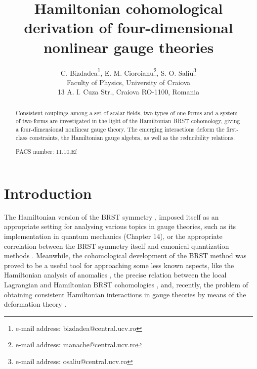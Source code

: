\documentclass[a4paper,12pt]{article}
\begin{document}
\author{C. Bizdadea\thanks{%
e-mail address: bizdadea@central.ucv.ro}, E. M. Cioroianu\thanks{%
e-mail address: manache@central.ucv.ro}, S. O. Saliu\thanks{%
e-mail address: osaliu@central.ucv.ro} \\
Faculty of Physics, University of Craiova\\
13 A. I. Cuza Str., Craiova RO-1100, Romania}
\title{Hamiltonian cohomological derivation of four-dimensional nonlinear gauge
theories }
\maketitle

\begin{abstract}
Consistent couplings among a set of scalar fields, two types of one-forms
and a system of two-forms are investigated in the light of the Hamiltonian
BRST cohomology, giving a four-dimensional nonlinear gauge theory. The
emerging interactions deform the first-class constraints, the Hamiltonian
gauge algebra, as well as the reducibility relations.

PACS number: 11.10.Ef
\end{abstract}

\section{Introduction}

The Hamiltonian version of the BRST symmetry \cite{2}, \cite{8} imposed
itself as an appropriate setting for analysing various topics in gauge
theories, such as its implementation in quantum mechanics \cite{2} (Chapter
14), or the appropriate correlation between the BRST symmetry itself and
canonical quantization methods \cite{9}. Meanwhile, the cohomological
development of the BRST method was proved to be a useful tool for
approaching some less known aspects, like the Hamiltonian analysis of
anomalies \cite{10}, the precise relation between the local Lagrangian and
Hamiltonian BRST cohomologies \cite{11}, and, recently, the problem of
obtaining consistent Hamiltonian interactions in gauge theories by means of
the deformation theory \cite{12}.
\end{document}
